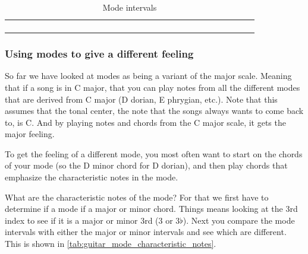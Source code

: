 \begin{table}[h]
\begin{NiceTabular}{*{30}{c}}
		\hline \\
		 &  & & & & & & & & & & & & &  & &  & &  & &  & &  & &  & &  & & \\
		\Block{}{} &  & & & & & & & & & & & &  & &  & &  & &  & &  & &  & &  & & \\
		\Block{}{} &  & & & & & & & & & & & &   & &  & &  & &  & &  & &  & &  & & \\
	\end{NiceTabular}
	\caption{Mode intervals}
	\label{tab:guitar_mode_intervals}
\end{table}

\newpage

\subsubsection{Using modes to give a different feeling}

So far we have looked at modes as being a variant of the major scale. Meaning that if a song is in C major, that you can play notes from all the different modes that are derived from C major (D dorian, E phrygian, etc.). Note that this assumes that the tonal center, the note that the songs always wants to come back to, is C. And by playing notes and chords from the C major scale, it gets the major feeling.

To get the feeling of a different mode, you most often want to start on the chords of your mode (so the D minor chord for D dorian), and then play chords that emphasize the characteristic notes in the mode.

What are the characteristic notes of the mode? For that we first have to determine if a mode if a major or minor chord. Things means looking at the 3rd index to see if it is a major or minor 3rd (3 or 3$\flat$). Next you compare the mode intervals with either the major or minor intervals and see which are different. This is shown in \autoref{tab:guitar_mode_characteristic_notes}.

